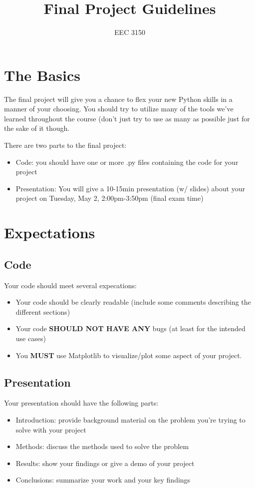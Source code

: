\documentclass[12pt]{article}%
\begin{document}
\title{Final Project Guidelines}

\author{EEC 3150}
\date{}
\maketitle

\tableofcontents

\section{The Basics}

The final project will give you a chance to flex your new Python skills in a manner of your choosing. You should try to utilize many of the tools we've learned throughout the course (don't just try to use as many as possible just for the sake of it though.

There are two parts to the final project:
\begin{itemize}
	\setlength\itemsep{-2pt}
	\item Code: you should have one or more .py files containing the code for your project
	\item Presentation: You will give a 10-15min presentation (w/ slides) about your project on Tuesday, May 2, 2:00pm-3:50pm (final exam time)
\end{itemize}

\section{Expectations}

\subsection{Code}
Your code should meet several expecations:
\begin{itemize}
	\setlength\itemsep{-2pt}
	\item Your code should be clearly readable (include some comments describing the different sections)
	\item Your code \textbf{SHOULD NOT HAVE ANY} bugs (at least for the intended use cases)
	\item You \textbf{MUST} use Matplotlib to visualize/plot some aspect of your project.
\end{itemize}

\subsection{Presentation}
Your presentation should have the following parts:
\begin{itemize}
	\setlength\itemsep{-2pt}
	\item Introduction: provide background material on the problem you're trying to solve with your project
	\item Methods: discuss the methods used to solve the problem
	\item Results: show your findings or give a demo of your project
	\item Conclusions: summarize your work and your key findings
\end{itemize}
\end{document}
